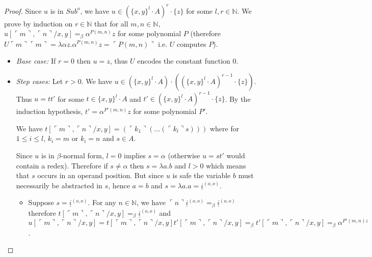 \documentclass{article}
\newcommand{\encode}[1]{\ulcorner #1 \urcorner}
\newcommand{\nat}{\mathbb{N}}
\begin{document}
\begin{proof}
Since $u$ is in $Sub^o$, we have $u \in (\{ x, y\}^l \cdot A)^r \cdot \{ z \}$ for some $l,r \in \nat$.
We prove by induction on $r \in \nat$ that for all $m,n \in\nat$, $u[\encode{m}, \encode{n}/x,y] =_\beta \alpha^{P(m,n)} z$ for some polynomial $P$ (therefore $U \encode{m} \encode{m}  = \lambda \alpha z . \alpha^{P(m,n)} z = \encode{P(m,n)}$ i.e. $U$ computes $P$).


\begin{itemize}

\item \emph{Base case:} If $r = 0$ then $u = z$, thus $U$ encodes the constant function $0$.


\item \emph{Step cases:} Let $r>0$. We have
 $u \in (\{ x, y\}^l \cdot A) \cdot \left( (\{ x, y\}^l \cdot A)^{r-1} \cdot \{ z \} \right)$. Thus $u = t t'$ for some $t \in \{ x, y\}^l \cdot A$ and $t' \in
(\{ x, y\}^l \cdot A)^{r-1} \cdot \{ z \}$. By the induction hypothesis, $t' = \alpha^{P'(m,n)} z$ for some polynomial $P'$.

We have $t[\encode{m}, \encode{n}/x,y] = (\encode{k_1} (\ldots (\encode{k_l} s)))$ where for $1 \leq i \leq l$, $k_i = m$ or $k_i = n$ and $s \in A$.

Since $u$ is in $\beta$-normal form, $l=0$ implies $s = \alpha$ 
(otherwise $u = s t'$ would contain a redex).
Therefore if $s \neq \alpha$ then $s=\lambda a . b$ and $l>0$ which means that $s$ occurs in an operand position. But since $u$ is safe the variable $b$ must necessarily be abstracted in $s$, hence $a=b$ and $s =  \lambda a . a = \underline{i}^{(o,o)}$.

\begin{itemize}
\item Suppose $s= \underline{i}^{(o,o)}$.
For any $n \in \nat$, we have $\encode{n} \underline{i}^{(o,o)} =_\beta \underline{i}^{(o,o)}$ therefore $t[\encode{m}, \encode{n}/x,y] =_\beta \underline{i}^{(o,o)}$ and $u[\encode{m}, \encode{n}/x,y] = t [\encode{m}, \encode{n}/x,y] t' [\encode{m}, \encode{n}/x,y] =_\beta t' [\encode{m}, \encode{n}/x,y] =_\beta \alpha^{P'(m,n) z}$.


\end{itemize}
\end{itemize}
\end{proof}
\end{document}
